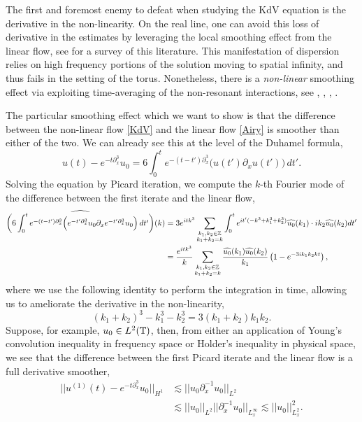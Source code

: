 
The first and foremost enemy to defeat when studying the KdV equation is the derivative in the non-linearity. On the real line, one can avoid this loss of derivative in the estimates by leveraging the local smoothing effect from the linear flow, see \cite[Chapter 4.1]{Tao2006} for a survey of this literature. This manifestation of dispersion relies on high frequency portions of the solution moving to spatial infinity, and thus fails in the setting of the torus. Nonetheless, there is a \textit{non-linear} smoothing effect via exploiting time-averaging of the non-resonant interactions, see \cite{Bourgain1993}, \cite{KenigEtAl1996a}, \cite{CollianderEtAl2003}, \cite{BabinEtAl2011}. 

The particular smoothing effect which we want to show is that the difference between the non-linear flow \eqref{KdV} and the linear flow \eqref{Airy} is smoother than either of the two. We can already see this at the level of the Duhamel formula, 
    \begin{equation}
        u(t) - e^{-t \partial_x^3} u_0
            =  6 \int_0^t e^{-(t - t') \partial_x^3} \Big(u(t')\partial_x u(t') \Big) \, dt'.
    \end{equation}
Solving the equation by Picard iteration, we compute the $k$-th Fourier mode of the difference between the first iterate and the linear flow, 
    \begin{align*}
        \widehat{\left(6 \int_0^t e^{-(t - t') \partial_x^3} \Big(e^{-t' \partial_x^3}u_0 \partial_x e^{-t' \partial_x^3} u_0 \Big) \, dt'\right)} (k) 
            &=  3e^{i t k^3} \sum_{\substack{k_1, k_2 \in \mathbb Z \\ k_1 + k_2 = k}}  \int_0^t e^{it' (-k^3 + k_1^3 + k_2^3)}  \widehat{u_0} (k_1) \cdot i k_2 \widehat{u_0} (k_2) dt' \\
            &= \frac{e^{i t k^3}}{k} \sum_{\substack{k_1, k_2 \in \mathbb Z \\ k_1 + k_2 = k}} \frac{\widehat{u_0}(k_1) \widehat{u_0} (k_2)}{k_1} \left(  1 - e^{-3i k_1 k_2 k t}\right),
    \end{align*}
where we use the following identity to perform the integration in time, allowing us to ameliorate the derivative in the non-linearity, 
    \begin{equation}\label{eq:identity}
        (k_1 + k_2)^3 - k_1^3 - k_2^3 = 3(k_1 + k_2) k_1 k_2.
    \end{equation}
Suppose, for example, $u_0 \in L^2 (\mathbb T)$, then, from either an application of Young's convolution inequality in frequency space or Holder's inequality in physical space, we see that the difference between the first Picard iterate and the linear flow is a full derivative smoother,
    \begin{align*}
        ||u^{(1)} (t) - e^{-t \partial_x^3} u_0||_{H^1}
            &\lesssim || u_0 \partial_x^{-1} u_0 ||_{L^2} \\
            &\lesssim || u_0||_{L^2} ||\partial_x^{-1} u_0||_{L^\infty_x} \lesssim ||u_0||_{L^2_x}^2. 
    \end{align*}

